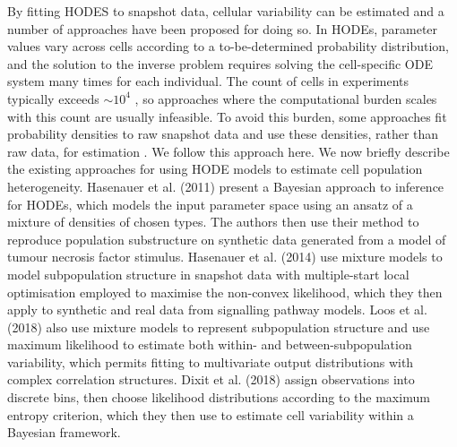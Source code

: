By fitting HODES to snapshot data, cellular variability can be estimated and a number of approaches have been proposed for doing so. In HODEs, parameter values vary across cells according to a to-be-determined probability distribution, and the solution to the inverse problem requires solving the cell-specific ODE system many times for each individual. The count of cells in experiments typically exceeds $\sim10^4$ \cite{hasenauer2011identification}, so approaches where the computational burden scales with this count are usually infeasible. To avoid this burden, some approaches fit probability densities to raw snapshot data and use these densities, rather than raw data, for estimation \cite{hasenauer2011identification,hasenauer2014ode,loos2018hierarchical,dixit2018maximum}. We follow this approach here. We now briefly describe the existing approaches for using HODE models to estimate cell population heterogeneity. Hasenauer et al. (2011) present a Bayesian approach to inference for HODEs, which models the input parameter space using an ansatz of a mixture of densities of chosen types. The authors then use their method to reproduce population substructure on synthetic data generated from a model of tumour necrosis factor stimulus. Hasenauer et al. (2014) use mixture models to model subpopulation structure in snapshot data with multiple-start local optimisation employed to maximise the non-convex likelihood, which they then apply to synthetic and real data from signalling pathway models. Loos et al. (2018) also use mixture models to represent subpopulation structure and use maximum likelihood to estimate both within- and between-subpopulation variability, which permits fitting to multivariate output distributions with complex correlation structures. Dixit et al. (2018) assign observations into discrete bins, then choose likelihood distributions according to the maximum entropy criterion, which they then use to estimate cell variability within a Bayesian framework.

